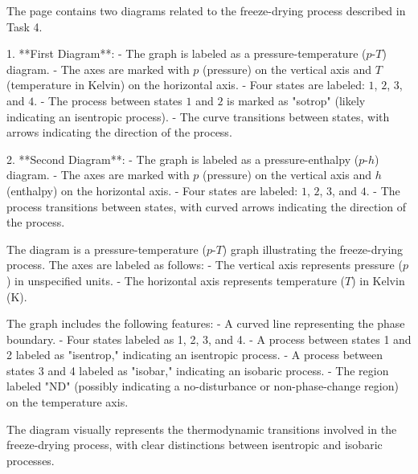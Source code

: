 The page contains two diagrams related to the freeze-drying process described in Task 4.  

1. **First Diagram**:  
   - The graph is labeled as a pressure-temperature (\(p\)-\(T\)) diagram.  
   - The axes are marked with \(p\) (pressure) on the vertical axis and \(T\) (temperature in Kelvin) on the horizontal axis.  
   - Four states are labeled: \(1\), \(2\), \(3\), and \(4\).  
   - The process between states \(1\) and \(2\) is marked as "sotrop" (likely indicating an isentropic process).  
   - The curve transitions between states, with arrows indicating the direction of the process.  

2. **Second Diagram**:  
   - The graph is labeled as a pressure-enthalpy (\(p\)-\(h\)) diagram.  
   - The axes are marked with \(p\) (pressure) on the vertical axis and \(h\) (enthalpy) on the horizontal axis.  
   - Four states are labeled: \(1\), \(2\), \(3\), and \(4\).  
   - The process transitions between states, with curved arrows indicating the direction of the process.

The diagram is a pressure-temperature (\( p \)-\( T \)) graph illustrating the freeze-drying process. The axes are labeled as follows:  
- The vertical axis represents pressure (\( p \)) in unspecified units.  
- The horizontal axis represents temperature (\( T \)) in Kelvin (\( \text{K} \)).  

The graph includes the following features:  
- A curved line representing the phase boundary.  
- Four states labeled as 1, 2, 3, and 4.  
- A process between states 1 and 2 labeled as "isentrop," indicating an isentropic process.  
- A process between states 3 and 4 labeled as "isobar," indicating an isobaric process.  
- The region labeled "ND" (possibly indicating a no-disturbance or non-phase-change region) on the temperature axis.  

The diagram visually represents the thermodynamic transitions involved in the freeze-drying process, with clear distinctions between isentropic and isobaric processes.
